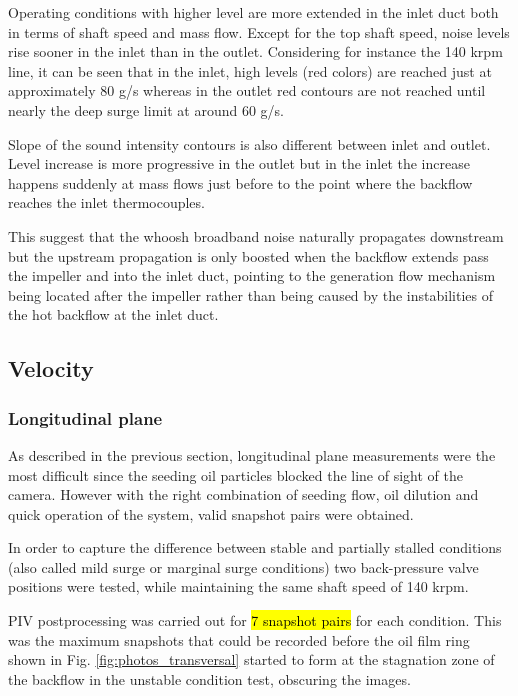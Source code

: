 Operating conditions with higher level are more extended in the inlet duct both in terms of shaft speed and mass flow. Except for the top shaft speed, noise levels rise sooner in the inlet than in the outlet. Considering for instance the 140 krpm line, it can be seen that in the inlet, high levels (red colors) are reached just at approximately 80 g/s whereas in the outlet red contours are not reached until nearly the deep surge limit at around 60 g/s.

Slope of the sound intensity contours is also different between inlet and outlet. Level increase is more progressive in the outlet but in the inlet the increase happens suddenly at mass flows just before to the point where the backflow reaches the inlet thermocouples. 

This suggest that the whoosh broadband noise naturally propagates downstream but the upstream propagation is only boosted when the backflow extends pass the impeller and into the inlet duct, pointing to the generation flow mechanism being located after the impeller rather than being caused by the instabilities of the hot backflow at the inlet duct.

\subsection{Velocity}
\label{sub:velocity}

\subsubsection{Longitudinal plane}

As described in the previous section, longitudinal plane measurements were the most difficult since the seeding oil particles blocked the line of sight of the camera. However with the right combination of seeding flow, oil dilution and quick operation of the system, valid snapshot pairs were obtained.

In order to capture the difference between stable and partially stalled conditions (also called mild surge or marginal surge conditions) two back-pressure valve positions were tested, while maintaining the same shaft speed of 140 krpm.

PIV postprocessing was carried out for \hl{7 snapshot pairs} for each condition. This was the maximum snapshots that could be recorded before the oil film ring shown in Fig. \ref{fig:photos_transversal} started to form at the stagnation zone of the backflow in the unstable condition test, obscuring the images. 

